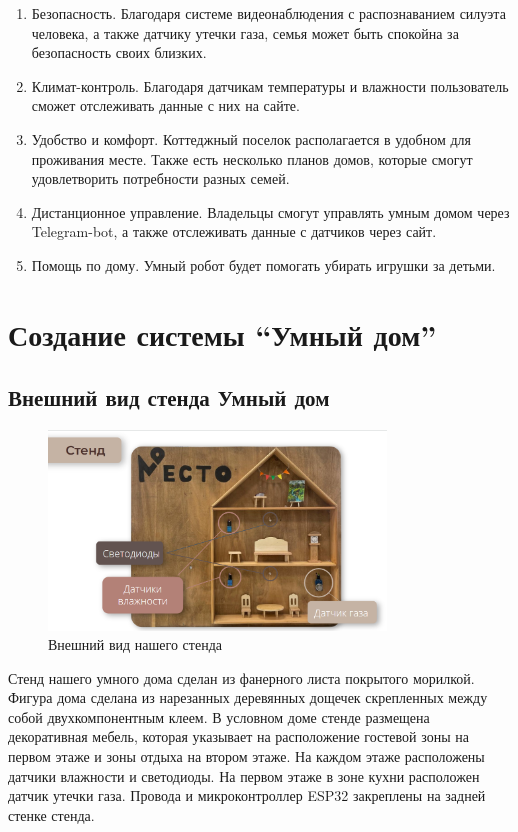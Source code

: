 \begin{enumerate}
	\item Безопасность. Благодаря системе видеонаблюдения с распознаванием силуэта человека, а также датчику утечки газа, семья может быть спокойна за безопасность своих близких. 
	\item Климат-контроль. Благодаря датчикам температуры и влажности пользователь сможет отслеживать данные с них на сайте.  
	\item Удобство и комфорт. Коттеджный поселок располагается в удобном для проживания месте. Также есть несколько планов домов, которые смогут удовлетворить потребности разных семей. 
	\item Дистанционное управление. Владельцы смогут управлять умным домом через Telegram-bot,  а также отслеживать данные с датчиков через сайт.  
	\item Помощь по дому. Умный робот будет помогать убирать игрушки за детьми.
\end{enumerate}

\chapter{Создание системы “Умный дом”}

\section{Внешний вид стенда Умный дом}

\begin{figure}[h!]
    \centering
	\includegraphics[width=0.8\textwidth]{./graphics/img/image13.png}
	\caption{Внешний вид нашего стенда}
	\label{fig:img13}
\end{figure}

Стенд нашего умного дома сделан из фанерного листа покрытого морилкой. Фигура дома сделана из нарезанных деревянных дощечек скрепленных между собой двухкомпонентным клеем. В условном доме стенде размещена декоративная мебель, которая указывает на расположение гостевой зоны на первом этаже и зоны отдыха на втором этаже. На каждом этаже расположены датчики влажности и светодиоды. На первом этаже в зоне кухни расположен датчик утечки газа. Провода и микроконтроллер ESP32 закреплены на задней стенке стенда.
\clearpage

